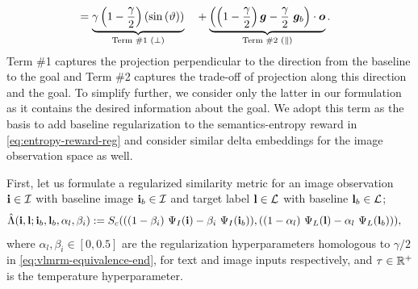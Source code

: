 \begin{align}
    &= \underbrace{\gamma\left(1 - \dfrac{\gamma}{2}\right)\left(\sin\left(\vartheta\right)\right)}_{\text{Term \#1 (\(\perp\))}} &&+ \underbrace{\left(\left(1 - \dfrac{\gamma}{2}\right) \bm{g} - \dfrac{\gamma}{2}\ \bm{g}_b\right) \cdot \bm{o}}_{\text{Term \#2 (\(\parallel\))}}.
    \label{eq:vlmrm-equivalence-end}
\end{align}
Term \#1 captures the projection perpendicular to the direction from the baseline to the goal and Term \#2 captures the trade-off of projection along this direction and the goal.
To simplify further, we consider only the latter in our formulation as it contains the desired information about the goal.
We adopt this term as the basis to add baseline regularization to the semantics-entropy reward in \eqref{eq:entropy-reward-reg} and consider similar delta embeddings for the image observation space as well.

First, let us formulate a regularized similarity metric for an image observation \(\mathbf{i} \in \mathcal{I}\) with baseline image \(\mathbf{i}_b \in \mathcal{I}\) and target label \(\mathbf{l} \in \mathcal{L}\) with baseline \(\mathbf{l}_b \in \mathcal{L}\);
\begin{equation}
    \label{eq:clip-similarity-reg}
    \begin{split}
        \hat{\Lambda}(\mathbf{i}, \mathbf{l}; \mathbf{i}_b, \mathbf{l}_b, \alpha_{l}, \beta_{i})
        &:= S_c(
            ((1 - \beta_{i})\ \Psi_I(\mathbf{i}) - \beta_{i}\ \Psi_I(\mathbf{i}_b)),
            ((1 - \alpha_{l})\ \Psi_L(\mathbf{l}) - \alpha_{l}\ \Psi_L(\mathbf{l}_b))
        ),
    \end{split}
\end{equation}
where \(\alpha_{l}, \beta_{i} \in [0, 0.5]\) are the regularization hyperparameters homologous to \(\gamma / 2\) in \eqref{eq:vlmrm-equivalence-end}, for text and image inputs respectively, and \(\tau \in \mathbb{R}^+\) is the temperature hyperparameter.

